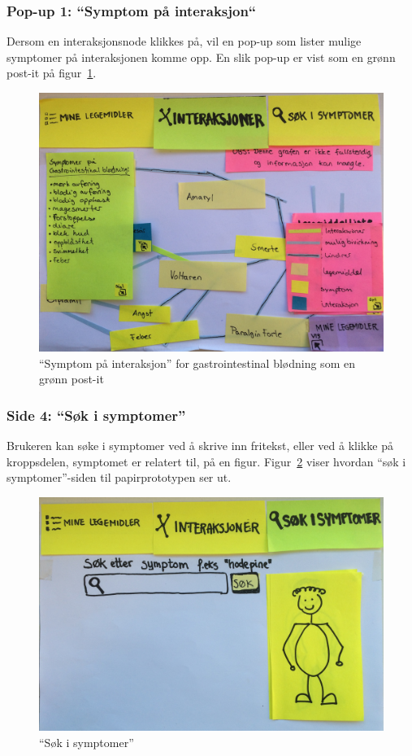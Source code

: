 \subsubsection{Pop-up 1: “Symptom på interaksjon“}
Dersom en interaksjonsnode klikkes på, vil en pop-up som lister mulige symptomer på interaksjonen komme opp. En slik pop-up er vist som en grønn post-it på figur~\ref{fig:interaksjonsgrafInfoPP}.

\begin{figure}[H]
    \centering
    \includegraphics[width=1\textwidth]{fig/utviklingAvPrototype/interaksjonsgrafInfoPP.jpg}
    \caption{“Symptom på interaksjon” for gastrointestinal blødning som en grønn post-it}
    \label{fig:interaksjonsgrafInfoPP}
\end{figure} 

\subsubsection{Side 4: “Søk i symptomer”} 
Brukeren kan søke i symptomer ved å skrive inn fritekst, eller ved å klikke på kroppsdelen, symptomet er relatert til, på en figur. Figur~\ref{fig:sokForPP} viser hvordan “søk i symptomer”-siden til papirprototypen ser ut.

\begin{figure}[H]
    \centering
    \includegraphics[width=1\textwidth]{fig/utviklingAvPrototype/sokForPP.jpg}
    \caption{“Søk i symptomer”}
    \label{fig:sokForPP}
\end{figure} 

